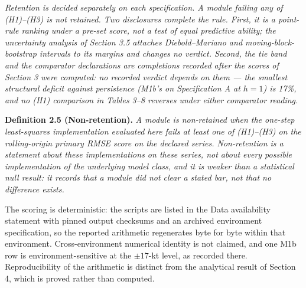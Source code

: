 \documentclass[11pt]{article}
\begin{document}
\emph{Retention is decided separately on each specification. A module
failing any of (H1)--(H3) is not retained. Two disclosures complete the
rule. First, it is a point-rule ranking under a pre-set score, not a
test of equal predictive ability; the uncertainty analysis of
Section 3.5 attaches Diebold--Mariano and moving-block-bootstrap
intervals to its margins and changes no verdict. Second, the tie band
and the comparator declarations are completions recorded after the
scores of Section 3 were computed: no recorded verdict depends on them
--- the smallest structural deficit against persistence (M1b's on
Specification A at \(h=1\)) is 17\%, and no (H1) comparison in Tables
3--8 reverses under either comparator reading.}

\textbf{Definition 2.5 (Non-retention).} \emph{A module is
non-retained when the one-step least-squares implementation evaluated
here fails at least one of (H1)--(H3) on the rolling-origin primary RMSE
score on the declared series. Non-retention is a statement about these
implementations on these series, not about every possible implementation
of the underlying model class, and it is weaker than a statistical null
result: it records that a module did not clear a stated bar, not that
no difference exists.}

The scoring is deterministic: the scripts are listed in the Data
availability statement with pinned output checksums and an archived
environment specification, so the reported arithmetic regenerates byte
for byte within that environment. Cross-environment numerical
identity is not claimed, and one M1b row is environment-sensitive at
the \(\pm 17\)-kt level, as recorded there.
Reproducibility of the arithmetic is distinct from the analytical result
of Section 4, which is proved rather than computed.
\end{document}
